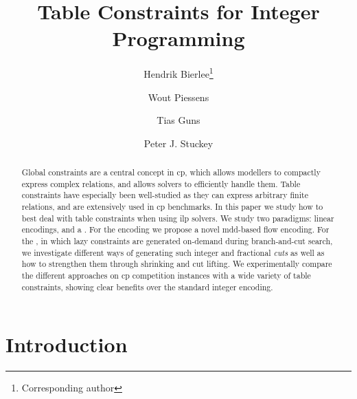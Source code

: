 \documentclass[a4paper,UKenglish,cleveref,autoref,thm-restate]{lipics-v2021}
\title{Table Constraints for Integer Programming}
\author{Hendrik Bierlee\footnote{Corresponding author}}{KU Leuven, Belgium}{henk.bierlee@kuleuven.be}{https://orcid.org/0000-0001-6766-5435}{}
\author{Wout Piessens}{KU Leuven, Belgium}{wout.piessens@kuleuven.be}{https://orcid.org/0009-0005-5608-2097}{}
\author{Tias Guns}{KU Leuven, Belgium}{tias.guns@kuleuven.be}{https://orcid.org/0000-0002-2156-2155}{}
\author{Peter J. Stuckey}{Monash University, Melbourne, Australia \and OPTIMA ITTC, Melbourne, Australia}{peter.stuckey@monash.edu}{https://orcid.org/0000-0003-2186-0459}{}
\newcommand{\milp}{\gls{ilp}\xspace}
\begin{document}
\maketitle

\begin{abstract}
Global constraints are a central concept in \gls{cp}, which allows modellers to compactly express complex relations, and allows solvers to efficiently handle them.
Table constraints have especially been well-studied as they can express arbitrary finite relations, and are extensively used in \gls{cp} benchmarks.
In this paper we study how to best deal with table constraints when using \milp solvers.
We study two paradigms: linear encodings, and a .
For the encoding we propose a novel 
\acrshort{mdd}-based flow encoding.
For the , in which lazy constraints are generated on-demand during branch-and-cut search, we investigate different ways of generating such integer and fractional \textit{cuts} as well as how to strengthen them through shrinking and cut lifting.
We experimentally compare the different approaches on \gls{cp} competition instances with a wide variety of table constraints, showing clear benefits over the standard integer encoding.

\end{abstract}

\glsresetall




\section{Introduction}
\label{sec:intro}
\end{document}
